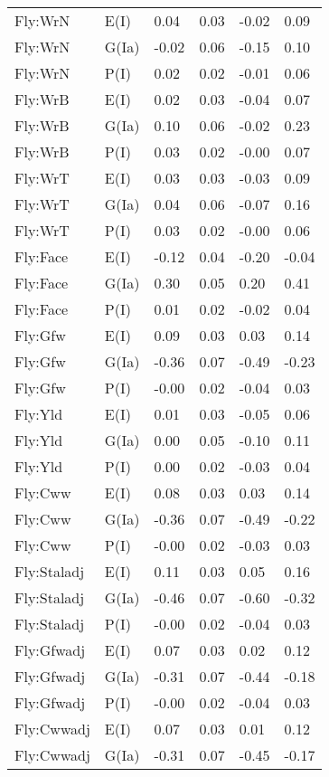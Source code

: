 \begin{center}
\begin{longtable}{|p{1.1in}|p{0.7in}|p{0.7in}|p{0.6in}|p{0.6in}|p{0.6in}|}
  Fly:WrN & E(I) & 0.04 & 0.03 & -0.02 & 0.09 \\ 
  Fly:WrN & G(Ia) & -0.02 & 0.06 & -0.15 & 0.10 \\ 
  Fly:WrN & P(I) & 0.02 & 0.02 & -0.01 & 0.06 \\ 
  Fly:WrB & E(I) & 0.02 & 0.03 & -0.04 & 0.07 \\ 
  Fly:WrB & G(Ia) & 0.10 & 0.06 & -0.02 & 0.23 \\ 
  Fly:WrB & P(I) & 0.03 & 0.02 & -0.00 & 0.07 \\ 
  Fly:WrT & E(I) & 0.03 & 0.03 & -0.03 & 0.09 \\ 
  Fly:WrT & G(Ia) & 0.04 & 0.06 & -0.07 & 0.16 \\ 
  Fly:WrT & P(I) & 0.03 & 0.02 & -0.00 & 0.06 \\ 
  Fly:Face & E(I) & -0.12 & 0.04 & -0.20 & -0.04 \\ 
  Fly:Face & G(Ia) & 0.30 & 0.05 & 0.20 & 0.41 \\ 
  Fly:Face & P(I) & 0.01 & 0.02 & -0.02 & 0.04 \\ 
  Fly:Gfw & E(I) & 0.09 & 0.03 & 0.03 & 0.14 \\ 
  Fly:Gfw & G(Ia) & -0.36 & 0.07 & -0.49 & -0.23 \\ 
  Fly:Gfw & P(I) & -0.00 & 0.02 & -0.04 & 0.03 \\ 
  Fly:Yld & E(I) & 0.01 & 0.03 & -0.05 & 0.06 \\ 
  Fly:Yld & G(Ia) & 0.00 & 0.05 & -0.10 & 0.11 \\ 
  Fly:Yld & P(I) & 0.00 & 0.02 & -0.03 & 0.04 \\ 
  Fly:Cww & E(I) & 0.08 & 0.03 & 0.03 & 0.14 \\ 
  Fly:Cww & G(Ia) & -0.36 & 0.07 & -0.49 & -0.22 \\ 
  Fly:Cww & P(I) & -0.00 & 0.02 & -0.03 & 0.03 \\ 
  Fly:Staladj & E(I) & 0.11 & 0.03 & 0.05 & 0.16 \\ 
  Fly:Staladj & G(Ia) & -0.46 & 0.07 & -0.60 & -0.32 \\ 
  Fly:Staladj & P(I) & -0.00 & 0.02 & -0.04 & 0.03 \\ 
  Fly:Gfwadj & E(I) & 0.07 & 0.03 & 0.02 & 0.12 \\ 
  Fly:Gfwadj & G(Ia) & -0.31 & 0.07 & -0.44 & -0.18 \\ 
  Fly:Gfwadj & P(I) & -0.00 & 0.02 & -0.04 & 0.03 \\ 
  Fly:Cwwadj & E(I) & 0.07 & 0.03 & 0.01 & 0.12 \\ 
  Fly:Cwwadj & G(Ia) & -0.31 & 0.07 & -0.45 & -0.17 \\ 

\end{longtable}
\end{center}
